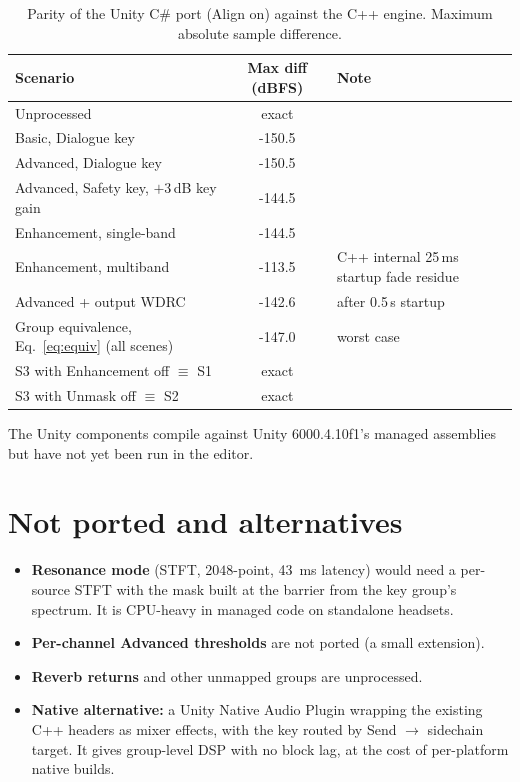 \documentclass[11pt]{article}
\begin{document}
\begin{table}[H]
\centering
\small
\caption{Parity of the Unity C\# port (Align on) against the C++ engine.
Maximum absolute sample difference.}
\label{tab:parity}
\begin{tabular}{@{}lS[table-format=-3.1]l@{}}
\toprule
\textbf{Scenario} & {\textbf{Max diff (dBFS)}} & \textbf{Note} \\
\midrule
Unprocessed                    & {exact} & \\
Basic, Dialogue key            & -150.5 & \\
Advanced, Dialogue key         & -150.5 & \\
Advanced, Safety key, $+3$\,dB key gain & -144.5 & \\
Enhancement, single-band       & -144.5 & \\
Enhancement, multiband         & -113.5 & C++ internal 25\,ms startup fade residue \\
Advanced + output WDRC         & -142.6 & after 0.5\,s startup \\
\midrule
Group equivalence, Eq.~\eqref{eq:equiv} (all scenes) & -147.0 & worst case \\
S3 with Enhancement off $\equiv$ S1 & {exact} & \\
S3 with Unmask off $\equiv$ S2 & {exact} & \\
\bottomrule
\end{tabular}
\end{table}

The Unity components compile against Unity 6000.4.10f1's managed assemblies
but have not yet been run in the editor.

\section{Not ported and alternatives}
\begin{itemize}[nosep]
  \item \textbf{Resonance mode} (STFT, $2048$-point, \SI{43}{\milli\second}
        latency) would need a per-source STFT with the mask built at the
        barrier from the key group's spectrum. It is CPU-heavy in managed
        code on standalone headsets.
  \item \textbf{Per-channel Advanced thresholds} are not ported (a small extension).
  \item \textbf{Reverb returns} and other unmapped groups are unprocessed.
  \item \textbf{Native alternative:} a Unity Native Audio Plugin wrapping the
        existing C++ headers as mixer effects, with the key routed by
        Send $\rightarrow$ sidechain target. It gives group-level DSP with no
        block lag, at the cost of per-platform native builds.
\end{itemize}
\end{document}
